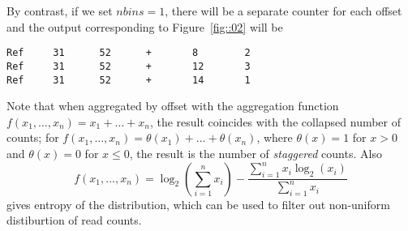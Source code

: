 \documentclass{article}
\begin{document}
By contrast, if we set $nbins=1$, there will be a separate counter for each offset and the output 
corresponding to Figure~\ref{fig::02} will be
\begin{verbatim}
Ref     31      52      +       8        2
Ref     31      52      +       12       3
Ref     31      52      +       14       1
\end{verbatim}
Note that when aggregated by offset with the aggregation function $f(x_1,\dots,x_n) = x_1+\dots+x_n$, the result
coincides with the collapsed number of counts; for $f(x_1,\dots,x_n) = \theta(x_1)+\dots+\theta(x_n)$, where 
$\theta(x)=1$ for $x>0$ and $\theta(x)=0$ for $x\le0$, the result is the number of {\em staggered} counts.
Also $$f(x_1,\dots,x_n) = \log_2(\sum\limits_{i=1}^nx_i) - \frac{\sum\limits_{i=1}^nx_i\log_2(x_i)}{\sum\limits_{i=1}^nx_i}$$
gives entropy of the distribution, which can be used to filter out non-uniform distiburtion of read counts.



\end{document}
